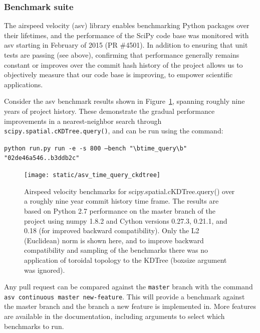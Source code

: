 \documentclass[fleqn,10pt]{wlscirep}
\begin{document}
    \subsubsection*{Benchmark suite}

    The airspeed velocity (asv) library enables benchmarking Python packages over their lifetimes, and the performance of the SciPy
    code base was monitored with asv starting in February of 2015 (PR \#4501). In addition to ensuring that unit tests are passing (see above),
    confirming that performance generally remains constant or improves over the commit hash history of the project allows us to objectively
    measure that our code base is improving, to empower scientific applications.

    Consider the asv benchmark results shown in Figure~\ref{fig:asvbench}, spanning roughly nine years of project history. These demonstrate the gradual performance
    improvements in a nearest-neighbor search through \texttt{scipy.spatial.cKDTree.query()}, and can be run using the command:


    \texttt{python run.py run -e -s 800 --bench "\textbackslash btime\_query\textbackslash b" "02de46a546..b3ddb2c"}

    \begin{figure}[H]
        \centering
        \texttt{[image: static/asv\_time\_query\_ckdtree]}
        \caption{Airspeed velocity benchmarks for scipy.spatial.cKDTree.query() over a roughly nine year commit history time frame. The results are based on Python 2.7 performance on the master branch of the project using numpy 1.8.2 and Cython versions 0.27.3, 0.21.1, and 0.18 (for improved backward compatibility). Only the L2 (Euclidean) norm is shown here, and to improve backward compatibility and sampling of the benchmarks there was no application of toroidal topology to the KDTree (boxsize argument was ignored).}
        \label{fig:asvbench}
    \end{figure}

   Any pull request can be compared against the \texttt{master} branch with the command \texttt{asv continuous master new-feature}. This will provide a benchmark against the master branch and the branch a new feature is implemented in. More features are available in the documentation, including arguments to select which benchmarks to run.
\end{document}
